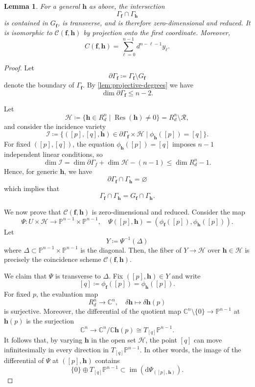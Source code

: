 \documentclass[11pt,letterpaper]{article}
\newtheorem{lemma}[theorem]{Lemma}\AddToHook{env/lemma/begin}{\crefalias{theorem}{lemma}}
\numberwithin{equation}{section}
\newcommand{\PP}{\mathbb{P}}
\newcommand{\CC}{\mathbb{C}}
\newcommand{\cR}{\mathcal{R}}
\newcommand{\cI}{\mathcal{I}}
\newcommand{\ff}{\ensuremath{\boldsymbol{f}}}
\newcommand{\hh}{\ensuremath{\boldsymbol{h}}}
\DeclareMathOperator{\Res}{Res}
\begin{document}
\begin{lemma}
\label{lem:coincidence-pts}
    For a general $\hh$ as above, the intersection \[
    \Gamma_{\ff}\cap \Gamma_{\hh}
    \] is contained in $G_{\ff}$, is transverse, and is therefore zero-dimensional and reduced.
    It is isomorphic to $\mathcal{C}(\ff,\hh)$ by projection onto the first coordinate.
    Moreover, \[
    C(\ff,\hh) = \sum_{\ell=0}^{n-1} d^{n-\ell-1} y_\ell.
    \]
\end{lemma}
\begin{proof}
Let \[
\partial \Gamma_{\ff}\coloneqq \Gamma_{\ff}\setminus G_{\ff}
\] denote the boundary of $\Gamma_{\ff}$.
By \cref{lem:projective-degrees} we have \[
\dim \partial\Gamma_{\ff} \leq n-2.
\]

Let \[
\mathcal{H}\coloneqq \{\hh\in R_d^n \mid \Res(\hh)\neq 0\} = R_d^n\setminus \cR,
\] and consider the incidence variety \[
\cI \coloneqq \{ ([p],[q],\hh)\in \partial \Gamma_{\ff}\times \mathcal{H} \mid \phi_{\hh}([p])=[q] \}.
\] For fixed $([p],[q])$, the equation $\phi_{\hh}([p])=[q]$ imposes $n-1$ independent linear conditions, so \[
\dim \cI = \dim \partial \Gamma_f + \dim \mathcal{H} - (n-1) \leq \dim R_d^n - 1.
\] Hence, for generic $\hh$, we have \[
\partial \Gamma_{\ff}\cap \Gamma_{\hh}=\varnothing 
\] which implies that \[ \Gamma_{\ff}\cap \Gamma_{\hh} = G_{\ff}\cap \Gamma_{\hh}.
\]

We now prove that $\mathcal{C}(\ff,\hh)$ is zero-dimensional and reduced.
Consider the map \[
\Psi : U\times \mathcal{H} \rightarrow \PP^{n-1}\times\PP^{n-1},\quad \Psi([p],\hh) = \left(\phi_{\ff}([p]), \phi_{\hh}([p])\right).
\]
Let \[
Y \coloneqq \Psi^{-1}(\Delta)
\] where $\Delta\subset\PP^{n-1}\times\PP^{n-1}$ is the diagonal.
Then, the fiber of $Y\rightarrow \mathcal{H}$ over $\hh\in \mathcal{H}$ is precisely the coincidence scheme $\mathcal{C}(\ff,\hh)$.

We claim that $\Psi$ is transverse to $\Delta$.
Fix $([p],\hh)\in Y$ and write \[
[q]\coloneqq \phi_{\ff}([p])=\phi_{\hh}([p]).
\]
For fixed $p$, the evaluation map \[
R_d^n \rightarrow \CC^n,\quad \delta \hh\mapsto \delta\hh(p)
\] is surjective. 
Moreover, the differential of the quotient map $\CC^n\setminus\{0\}\rightarrow \PP^{n-1}$ at $\hh(p)$ is the surjection \[
\CC^n \rightarrow \CC^{n}/\CC \hh(p) \cong T_{[q]}\PP^{n-1}.
\] 
It follows that, by varying $\hh$ in the open set $\mathcal{H}$, the point $[q]$ can move infinitesimally in every direction in $T_{[q]}\PP^{n-1}$.
In other words, the image of the differential of $\Psi$ at $([p],\hh)$ contains \[
\{0\}\oplus T_{[q]}\PP^{n-1}\subset \operatorname{im}\left(\mathrm{d} \Psi_{([p],\hh)}\right).
\]


\end{proof}
\end{document}
